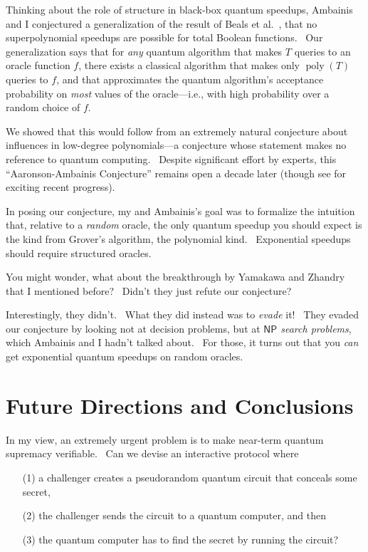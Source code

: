 \documentclass[12pt]{article}
\begin{document}
Thinking about the role of structure in black-box quantum speedups, Ambainis and I \cite{aa:struc} conjectured a generalization of the result of Beals et al.\ \cite{bbcmw}, that no superpolynomial speedups are possible for total Boolean functions. \ Our generalization says that for \emph{any} quantum algorithm that makes $T$ queries to an oracle function $f$, there exists a classical algorithm that makes only $\operatorname{poly}(T)$ queries to $f$, and that approximates the quantum algorithm's acceptance probability on \emph{most} values of the oracle---i.e., with high probability over a random choice of $f$.

We showed that this would follow from an extremely natural conjecture about influences in low-degree polynomials---a conjecture whose statement makes no reference to quantum computing. \ Despite significant effort by experts, this ``Aaronson-Ambainis Conjecture'' remains open a decade later (though see \cite{bsw} for exciting recent progress).

In posing our conjecture, my and Ambainis's goal was to formalize the intuition that, relative to a \emph{random} oracle, the only quantum speedup you should expect is the kind from Grover's algorithm, the polynomial kind. \ Exponential speedups should require structured oracles.

You might wonder, what about the breakthrough by Yamakawa and Zhandry \cite{yz} that I mentioned before? \ Didn't they just refute our conjecture?

Interestingly, they didn't. \ What they did instead was to \emph{evade} it! \ They evaded our conjecture by looking not at decision problems, but at \emph{$\mathsf{NP}$ search problems}, which Ambainis and I hadn't talked about. \ For those, it turns out that you \emph{can} get exponential quantum speedups on random oracles.


\section{Future Directions and Conclusions}

In my view, an extremely urgent problem is to make near-term quantum supremacy verifiable. \ Can we devise an interactive protocol where

\begin{enumerate}
\item[(1)] a challenger creates a pseudorandom quantum circuit that conceals some secret,
\item[(2)] the challenger sends the circuit to a quantum computer, and then
\item[(3)] the quantum computer has to find the secret by running the circuit?
\end{enumerate}
\end{document}
